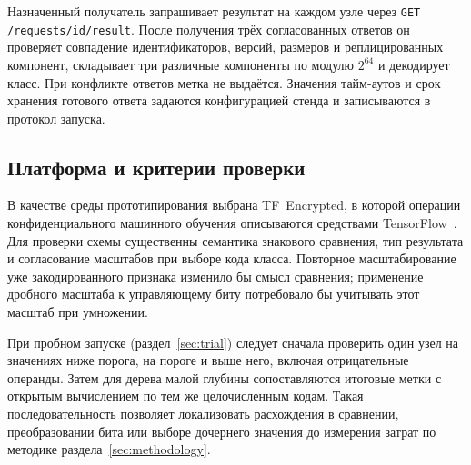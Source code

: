 Назначенный получатель запрашивает результат на каждом узле через \texttt{GET /requests/id/result}. После получения трёх согласованных ответов он проверяет совпадение идентификаторов, версий, размеров и реплицированных компонент, складывает три различные компоненты по модулю $2^{64}$ и декодирует класс. При конфликте ответов метка не выдаётся. Значения тайм-аутов и срок хранения готового ответа задаются конфигурацией стенда и записываются в протокол запуска.

\subsection{Платформа и критерии проверки}

В качестве среды прототипирования выбрана TF~Encrypted, в которой операции
конфиденциального машинного обучения описываются средствами
TensorFlow~\cite{dahl2018tfe}. Для проверки схемы существенны семантика
знакового сравнения, тип результата и согласование масштабов при выборе
кода класса. Повторное масштабирование уже закодированного признака
изменило бы смысл сравнения; применение дробного масштаба к управляющему
биту потребовало бы учитывать этот масштаб при умножении.

При пробном запуске (раздел~\ref{sec:trial}) следует сначала проверить
один узел на значениях ниже порога, на пороге и выше него, включая
отрицательные операнды. Затем для дерева малой глубины сопоставляются
итоговые метки с открытым вычислением по тем же целочисленным кодам.
Такая последовательность позволяет локализовать расхождения в сравнении,
преобразовании бита или выборе дочернего значения до измерения затрат по
методике раздела~\ref{sec:methodology}.
